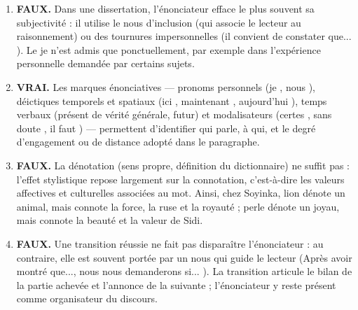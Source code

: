 \documentclass[11pt]{article}
\newcommand{\cle}[1]{{\popxbold\color{popdark}#1}}
\begin{document}
\begin{corrige}
\begin{enumerate}
\item \textbf{FAUX.} Dans une dissertation, l'énonciateur efface le plus souvent sa subjectivité : il utilise le \og nous \fg{} d'inclusion (qui associe le lecteur au raisonnement) ou des tournures impersonnelles (\og il convient de constater que... \fg). Le \og je \fg{} n'est admis que ponctuellement, par exemple dans l'expérience personnelle demandée par certains sujets.
\item \textbf{VRAI.} Les marques énonciatives — pronoms personnels (\og je \fg, \og nous \fg), déictiques temporels et spatiaux (\og ici \fg, \og maintenant \fg, \og aujourd'hui \fg), temps verbaux (présent de vérité générale, futur) et modalisateurs (\og certes \fg, \og sans doute \fg, \og il faut \fg) — permettent d'identifier qui parle, à qui, et le degré d'engagement ou de distance adopté dans le paragraphe.
\item \textbf{FAUX.} La dénotation (sens propre, définition du dictionnaire) ne suffit pas : l'effet stylistique repose largement sur la \cle{connotation}, c'est-à-dire les valeurs affectives et culturelles associées au mot. Ainsi, chez Soyinka, \og lion \fg{} dénote un animal, mais connote la force, la ruse et la royauté ; \og perle \fg{} dénote un joyau, mais connote la beauté et la valeur de Sidi.
\item \textbf{FAUX.} Une transition réussie ne fait pas disparaître l'énonciateur : au contraire, elle est souvent portée par un \og nous \fg{} qui guide le lecteur (\og Après avoir montré que..., nous nous demanderons si... \fg). La transition articule le bilan de la partie achevée et l'annonce de la suivante ; l'énonciateur y reste présent comme organisateur du discours.
\end{enumerate}
\end{corrige}
\end{document}
